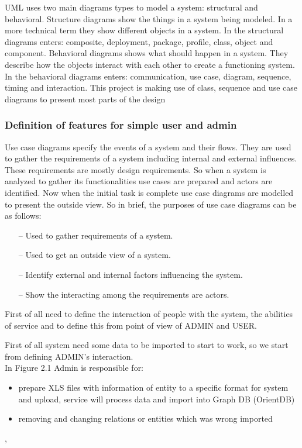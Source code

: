 \documentclass[12pt,a4paper,titlepage]{article}
\begin{document}
UML uses two main diagrams types to model a system: structural and behavioral. Structure
diagrams show the things in a system being modeled. In a more technical term they show different
objects in a system. In the structural diagrams enters: composite, deployment, package, profile,
class, object and component. Behavioral diagrams shows what should happen in a system. They
describe how the objects interact with each other to create a functioning system. In the behavioral
diagrams enters: communication, use case, diagram, sequence, timing and interaction. This project
is making use of class, sequence and use case diagrams to present most parts of the design\\

\subsubsection{Definition of features for simple user and admin}
Use case diagrams specify the events of a system and their flows. They are used to gather the
requirements of a system including internal and external influences. These requirements are mostly
design requirements. So when a system is analyzed to gather its functionalities use cases are prepared
and actors are identified. Now when the initial task is complete use case diagrams are modelled to
present the outside view. So in brief, the purposes of use case diagrams can be as follows:

\begin{itemize}
\item[--] Used to gather requirements of a system.
\item[--] Used to get an outside view of a system.
\item[--] Identify external and internal factors influencing the system.
\item[--] Show the interacting among the requirements are actors.
\end{itemize}

First of all need to define the interaction of people with the system, the abilities of service and to define this from point of view of ADMIN and USER.

First of all system need some data to be imported to start to work, so we start from defining ADMIN's interaction.\\

In Figure 2.1 Admin is responsible for:
\begin{itemize}
\item prepare XLS files with information of entity to a specific format for system and upload, service will process data and import into Graph DB (OrientDB)
\item removing and changing relations or entities which was wrong imported
\end{itemize}
  , 
\end{document}
